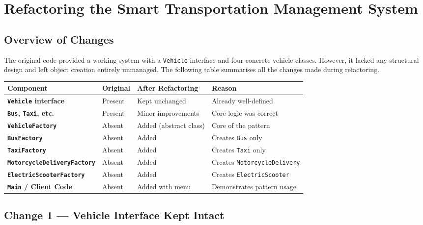 \documentclass[12pt, a4paper]{article}
\begin{document}
\newpage

\section{Refactoring the Smart Transportation Management System}

\subsection{Overview of Changes}

The original code provided a working system with a \texttt{Vehicle} interface and four concrete vehicle classes. However, it lacked any structural design and left object creation entirely unmanaged. The following table summarises all the changes made during refactoring.

\begin{center}
\begin{tabular}{>{\bfseries}l l l p{5.5cm}}
\toprule
\textbf{Component} & \textbf{Original} & \textbf{After Refactoring} & \textbf{Reason} \\
\midrule
\texttt{Vehicle} interface & Present & Kept unchanged & Already well-defined \\[4pt]
\texttt{Bus}, \texttt{Taxi}, etc. & Present & Minor improvements & Core logic was correct \\[4pt]
\texttt{VehicleFactory} & Absent & Added (abstract class) & Core of the pattern \\[4pt]
\texttt{BusFactory} & Absent & Added & Creates \texttt{Bus} only \\[4pt]
\texttt{TaxiFactory} & Absent & Added & Creates \texttt{Taxi} only \\[4pt]
\texttt{MotorcycleDeliveryFactory} & Absent & Added & Creates \texttt{MotorcycleDelivery} \\[4pt]
\texttt{ElectricScooterFactory} & Absent & Added & Creates \texttt{ElectricScooter} \\[4pt]
\texttt{Main} / Client Code & Absent & Added with menu & Demonstrates pattern usage \\
\bottomrule
\end{tabular}
\end{center}

\subsection{Change 1 --- Vehicle Interface Kept Intact}
\end{document}

